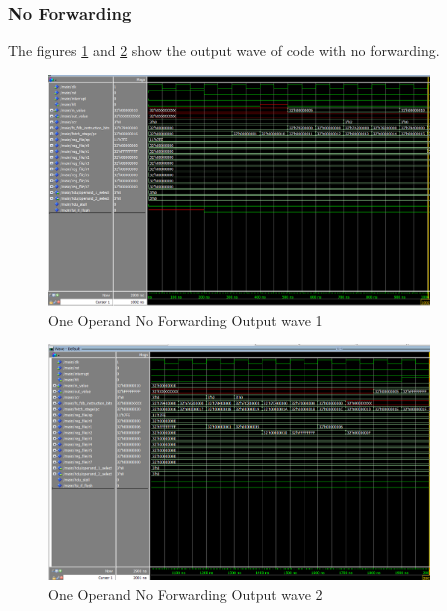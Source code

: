 \subsubsection{No Forwarding}
The figures \ref{fig:1op_no_1} and \ref{fig:1op_no_2} show the output wave of code with no forwarding.
\begin{figure}[H]
    \centering
    \includegraphics[width=0.9\textwidth]{images/test_cases/one_operand/OneOperand_no_forward_1.PNG}
    \caption{One Operand No Forwarding Output wave 1}
    \label{fig:1op_no_1}
\end{figure}

\begin{figure}[H]
    \centering
    \includegraphics[width=0.9\textwidth]{images/test_cases/one_operand/OneOperand_no_forward_2.PNG}
    \caption{One Operand No Forwarding Output wave 2}
    \label{fig:1op_no_2}
\end{figure}


